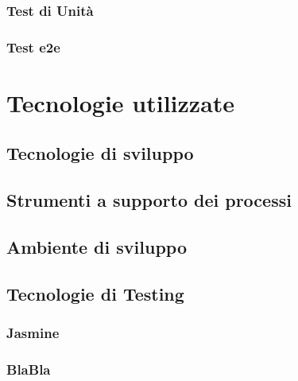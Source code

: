 \subsubsection{Test di Unità}

\subsubsection{Test e2e}


\section{Tecnologie utilizzate}
\subsection{Tecnologie di sviluppo}

\subsection{Strumenti a supporto dei processi}

\subsection{Ambiente di sviluppo}

\subsection{Tecnologie di Testing}
\subsubsection{Jasmine}
\subsubsection{BlaBla}
